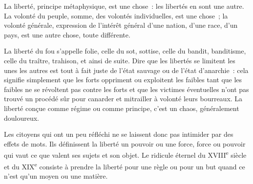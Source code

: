 \documentclass[french,twoside]{book} %
\newcommand{\astermono}{\medskip\centerline{\color{rubric}\large\selectfont{\syms ✻}}\medskip\par}%
\begin{document}
\astermono

\noindent La liberté, principe métaphysique, est une chose : les libertés en sont une autre. La volonté du peuple, somme, des volontés individuelles, est une chose ; la volonté générale, expression de l’intérêt général d’une nation, d’une race, d’un pays, est une autre chose, toute différente.\par

\astermono

\noindent La liberté du fou s’appelle folie, celle du sot, sottise, celle du bandit, banditisme, celle du traître, trahison, et ainsi de suite. Dire que les libertés se limitent les unes les autres est tout à fait juste de l’état sauvage ou de l’état d’anarchie : cela signifie simplement que les forts oppriment ou exploitent les faibles tant que les faibles ne se révoltent pas contre les forts et que les victimes éventuelles n’ont pas trouvé un procédé sûr pour canarder et mitrailler à volonté leurs bourreaux. La liberté conçue comme régime ou comme principe, c’est un chaos, généralement douloureux.\par
Les citoyens qui ont un peu réfléchi ne se laissent donc pas intimider par des effets de mots. Ils définissent la liberté un pouvoir ou une force, force ou pouvoir qui vaut ce que valent ses sujets et son objet. Le ridicule éternel du XVIII\textsuperscript{e} siècle et du XIX\textsuperscript{e} consiste à prendre la liberté pour une règle ou pour un but quand ce n’est qu’un moyen ou une matière.\par

\astermono
\end{document}
